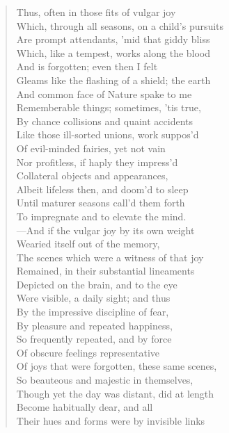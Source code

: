 \begin{verse}
Thus, often in those fits of vulgar joy  \\
Which, through all seasons, on a child's pursuits  \\
Are prompt attendants, 'mid that giddy bliss	  \\
Which, like a tempest, works along the blood  \\
And is forgotten; even then I felt  \\
Gleams like the flashing of a shield; the earth  \\
And common face of Nature spake to me  \\
Rememberable things; sometimes, 'tis true,	  \\
By chance collisions and quaint accidents  \\
Like those ill-sorted unions, work suppos'd  \\
Of evil-minded fairies, yet not vain  \\
Nor profitless, if haply they impress'd  \\
Collateral objects and appearances,	  \\
Albeit lifeless then, and doom'd to sleep  \\
Until maturer seasons call'd them forth  \\
To impregnate and to elevate the mind.  \\
---And if the vulgar joy by its own weight  \\
Wearied itself out of the memory,	  \\
The scenes which were a witness of that joy  \\
Remained, in their substantial lineaments  \\
Depicted on the brain, and to the eye  \\
Were visible, a daily sight; and thus  \\
By the impressive discipline of fear,	  \\
By pleasure and repeated happiness,  \\
So frequently repeated, and by force  \\
Of obscure feelings representative  \\
Of joys that were forgotten, these same scenes,  \\
So beauteous and majestic in themselves,	  \\
Though yet the day was distant, did at length  \\
Become habitually dear, and all  \\
Their hues and forms were by invisible links  \\

\end{verse}
